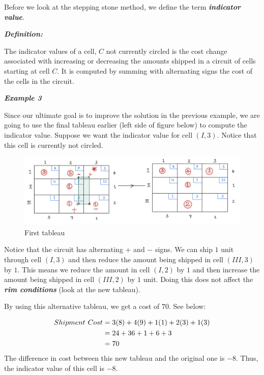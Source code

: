 \documentclass[
  letterpaper,
  DIV=11,
  numbers=noendperiod]{scrreprt}
\begin{document}
Before we look at the stepping stone method, we define the term
\textbf{\emph{indicator value}}.

\textbf{\emph{Definition:}}

The indicator values of a cell, \(C\) not currently circled is the cost
change associated with increasing or decreasing the amounts shipped in a
circuit of cells starting at cell \(C\). It is computed by summing with
alternating signs the cost of the cells in the circuit.

\textbf{\emph{Example 3}}

Since our ultimate goal is to improve the solution in the previous
example, we are going to use the final tableau earlier (left side of
figure below) to compute the indicator value. Suppose we want the
indicator value for cell \((I, 3)\). Notice that this cell is currently
not circled.

\begin{figure}

{\centering \includegraphics{images/m.jpeg}

}

\caption{First tableau}

\end{figure}

Notice that the circuit has alternating \(+\) and \(-\) signs. We can
ship \(1\) unit through cell \((I,3)\) and then reduce the amount being
shipped in cell \((III,3)\) by \(1\). This means we reduce the amount in
cell \((I,2)\) by \(1\) and then increase the amount being shipped in
cell \((III,2)\) by \(1\) unit. Doing this does not affect the
\textbf{\emph{rim conditions}} (look at the new tableau).

By using this alternative tableau, we get a cost of \(70\). See below:

\[
\begin{aligned}
Shipment \hspace{.05in}Cost&= 3(8)+4(9)+1(1)+2(3)+1(3)\\
&=24+36+1+6+3\\
&=70
\end{aligned}
\] The difference in cost between this new tableau and the original one
is \(-8\). Thus, the indicator value of this cell is \(-8\).
\end{document}
